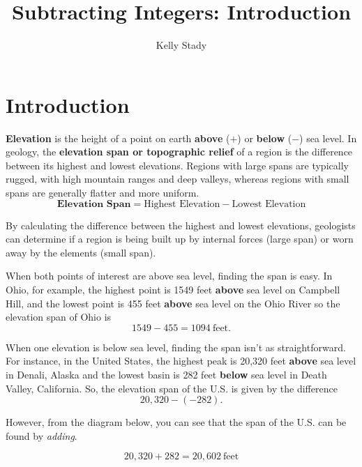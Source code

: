 \documentclass{ximera}[font=12pt]
\title{Subtracting Integers:  Introduction}   %
\author{Kelly Stady}
\begin{document}
\begin{abstract}

\end{abstract}

\maketitle
\label{xim:SubtractInt}


\section*{Introduction}

\textbf{Elevation} is the height of a point on earth \textbf{above} ($+$) or \textbf{below} ($-$) sea level.  In geology, the \textbf{elevation span or topographic relief} of a region is the difference between its highest and lowest elevations. Regions with large spans are typically rugged, with high mountain ranges and deep valleys, whereas regions with small spans are generally flatter and more uniform.
\[ \textbf{Elevation Span} = \textrm{Highest Elevation} - \textrm{Lowest Elevation} \]

By calculating the difference between the highest and lowest elevations, geologists can determine if a region is being built up by internal forces (large span) or worn away by the elements (small span).

When both points of interest are above sea level, finding the span is easy.  In Ohio, for example, the highest point is 1549 
feet \textbf{above} sea level on Campbell Hill, and the lowest point is 455 feet \textbf{above} sea level on the Ohio River so the elevation span of Ohio is
\[ 1549 - 455 = 1094 \ \textrm{feet}. \]

When one elevation is below sea level, finding the span isn't as straightforward.  For instance, in the United States, the highest peak is 
20,320 feet \textbf{above} sea level in Denali, Alaska and the lowest basin is 282 feet \textbf{below} sea level in Death Valley, California.  
So, the elevation span of the U.S. is given by the difference
\[ 20,320 - (-282). \]

However, from the diagram below, you can see that the span of the U.S. can be found by \emph{adding}.

\[ 20,320 + 282 = 20,602 \ \textrm{feet} \]
\end{document}
